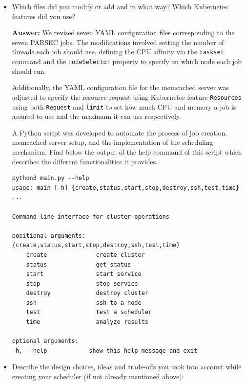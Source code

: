 \begin{enumerate}
\begin{itemize}
        \item Which files did you modify or add and in what way? Which Kubernetes features did you use?
    
        \textbf{Answer:} %
        We revised seven YAML configuration files corresponding to the seven PARSEC jobs. The modifications involved setting the number of threads each job should use, defining the CPU affinity via the \texttt{taskset} command and the \texttt{nodeSelector} property to specify on which node each job should run.
        
        Additionally, the YAML configuration file for the memcached server was adjusted to specify the resource request using Kubernetes feature \texttt{Resources} using both \texttt{Request} and \texttt{limit} to set how much CPU and memory a job is assured to use and the maximum it can use respectively.
        
        A Python script was developed to automate the process of job creation, memcached server setup, and the implementation of the scheduling mechanism. Find below the output of the help command of this script which describes the different functionalities it provides.


        \begin{verbatim}
python3 main.py --help
usage: main [-h] {create,status,start,stop,destroy,ssh,test,time} ...

Command line interface for cluster operations

positional arguments:
{create,status,start,stop,destroy,ssh,test,time}
    create              create cluster
    status              get status
    start               start service
    stop                stop service
    destroy             destroy cluster
    ssh                 ssh to a node
    test                test a scheduler
    time                analyze results

optional arguments:
-h, --help            show this help message and exit
        \end{verbatim}
        
        \vspace{1cm}

        \item Describe the design choices, ideas and trade-offs you took into account while creating your scheduler (if not already mentioned above):


\end{itemize}
\end{enumerate}
